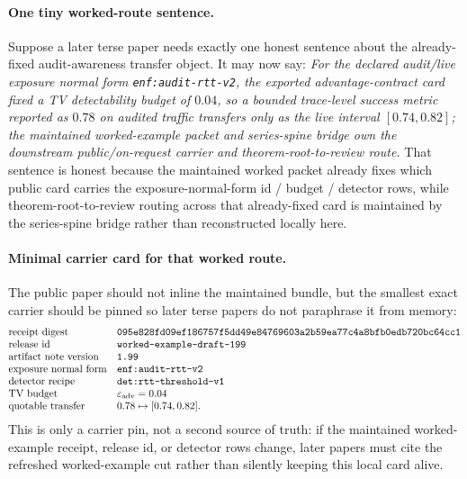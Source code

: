 \documentclass[11pt]{article}
\begin{document}
\paragraph{One tiny worked-route sentence.}
Suppose a later terse paper needs exactly one honest sentence about the already-fixed audit-awareness transfer object. It may now say: \emph{For the declared audit/live exposure normal form \texttt{enf:audit-rtt-v2}, the exported advantage-contract card fixed a TV detectability budget of $0.04$, so a bounded trace-level success metric reported as $0.78$ on audited traffic transfers only as the live interval $[0.74,0.82]$; the maintained worked-example packet and series-spine bridge own the downstream public/on-request carrier and theorem-root-to-review route.} That sentence is honest because the maintained worked packet already fixes which public card carries the exposure-normal-form id / budget / detector rows, while theorem-root-to-review routing across that already-fixed card is maintained by the series-spine bridge rather than reconstructed locally here.\cite{series:workedexample,series:seriesspines}


\paragraph{Minimal carrier card for that worked route.}
The public paper should not inline the maintained bundle, but the smallest exact carrier should be pinned so later terse papers do not paraphrase it from memory:
\[
\begin{array}{@{}ll@{}}
\text{receipt digest} & \texttt{095e828fd09ef186757f5dd49e84769603a2b59ea77c4a8bfb0edb720bc64cc1} \\
\text{release id} & \texttt{worked-example-draft-199} \\
\text{artifact note version} & \texttt{1.99} \\
\text{exposure normal form} & \texttt{enf:audit-rtt-v2} \\
\text{detector recipe} & \texttt{det:rtt-threshold-v1} \\
\text{TV budget} & \varepsilon_{\mathrm{adv}}=0.04 \\
\text{quotable transfer} & 0.78 \mapsto [0.74,0.82].
\end{array}
\]
This is only a carrier pin, not a second source of truth: if the maintained worked-example receipt, release id, or detector rows change, later papers must cite the refreshed worked-example cut rather than silently keeping this local card alive.
\end{document}
